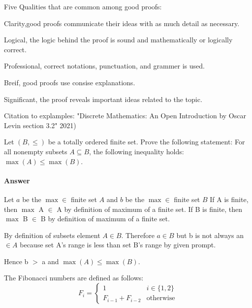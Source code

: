 \documentclass{article}
\begin{document}
{Five Qualities that are common among good proofs: }


{Clarity,good proofs communicate their ideas with as much detail as necessary.}

{Logical, the logic behind the proof is sound and mathematically or logically correct.}

{Professional, correct notations, punctuation, and grammer is used.}

{Breif, good proofs use consise explanations.}

{Significant, the proof reveals important ideas related to the topic.}


{Citation to explamples: "Discrete Mathematics: An Open Introduction by Oscar Levin section 3.2" 2021)


 

Let $(B,\leq)$ be a totally ordered finite set. Prove the following
statement: For all nonempty subsets $A \subseteq B$, the following inequality
holds: $\max(A) \leq \max(B)$.

\paragraph{Answer}

Let $a$ be the $\max \in$ finite set $A$ and $b$ be the $\max \in$ finite set $B$
If A is finite, then $\max$ A $\in$ A by definition of maximum of a finite set.
If B is finite, then $\max$ B $\in$ B by definition of maximum of a finite set.

By definition of subsets element $A \in B$. Therefore $a \in B$ but b is not always
an $\in A$ because set A's range is less than set B's range by given prompt.

Hence b $>$ a and $\max(A) \leq \max(B)$.

 

The Fibonacci numbers are defined as follows:
$$
    F_i = \begin{cases}
            1 & i \in \{1,2\} \\
            F_{i-1}+F_{i-2} & \text{otherwise}
          \end{cases}
$$

}
\end{document}
